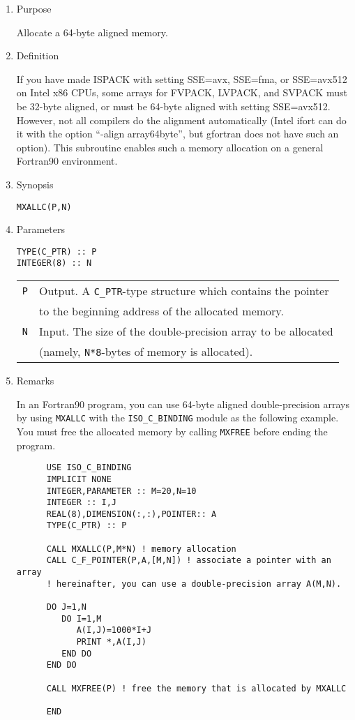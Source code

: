 \documentclass[a4paper]{scrartcl}
\begin{document}
\begin{enumerate}

\item Purpose

Allocate a 64-byte aligned memory.

\item Definition

If you have made ISPACK with setting SSE=avx,  SSE=fma, or SSE=avx512
on Intel x86 CPUs, some arrays for FVPACK, LVPACK, and
SVPACK must be 32-byte aligned, or must be 64-byte aligned
with setting SSE=avx512.
However, not all compilers
do the alignment automatically (Intel ifort can do it 
with the option ``-align array64byte'', but gfortran does
not have such an option).
This subroutine enables such a memory allocation on a 
general Fortran90 environment.

\item Synopsis
    
\texttt{MXALLC(P,N)}
  
\item Parameters

\begin{verbatim}
TYPE(C_PTR) :: P
INTEGER(8) :: N
\end{verbatim}
    
\begin{tabular}{ll}
\texttt{P} & Output. 
A \texttt{C\_PTR}-type structure which contains the pointer \\
& 
to the beginning address of the allocated memory.\\
\texttt{N} & Input. The size of the double-precision array
to be allocated \\
&    (namely, \texttt{N*8}-bytes of memory is allocated).
\end{tabular}

\item Remarks

In an Fortran90 program, you can use 64-byte aligned 
double-precision arrays by using \texttt{MXALLC} with 
the \texttt{ISO\_C\_BINDING} module as the following example.
You must free the allocated memory by calling \texttt{MXFREE}
before ending the program.

\begin{verbatim}
      USE ISO_C_BINDING
      IMPLICIT NONE
      INTEGER,PARAMETER :: M=20,N=10
      INTEGER :: I,J
      REAL(8),DIMENSION(:,:),POINTER:: A
      TYPE(C_PTR) :: P

      CALL MXALLC(P,M*N) ! memory allocation 
      CALL C_F_POINTER(P,A,[M,N]) ! associate a pointer with an array
      ! hereinafter, you can use a double-precision array A(M,N).

      DO J=1,N
         DO I=1,M
            A(I,J)=1000*I+J
            PRINT *,A(I,J)
         END DO
      END DO

      CALL MXFREE(P) ! free the memory that is allocated by MXALLC
        
      END
\end{verbatim}

\end{enumerate}
\end{document}
